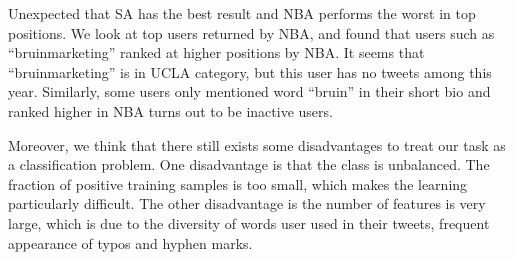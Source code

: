 \documentclass{article}
\begin{document}
Unexpected that SA has the best result and NBA performs the worst in top positions. We look at top users returned by NBA, and found that users such as ``bruinmarketing'' ranked at higher positions by NBA. It seems that ``bruinmarketing'' is in UCLA category, but this user has no tweets among this year. Similarly, some users only mentioned word ``bruin'' in their short bio and ranked higher in NBA turns out to be inactive users.

Moreover, we think that there still exists some disadvantages to treat our task as a classification problem. One disadvantage is that the class is unbalanced. The fraction of positive training samples is too small, which makes the learning particularly difficult. The other disadvantage is the number of features is very large, which is due to the diversity of words user used in their tweets, frequent appearance of typos and hyphen marks.

\ifx \allfiles \undefined
\end{document}
